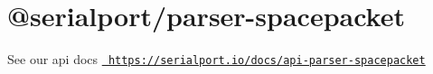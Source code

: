 \chapter{@serialport/parser-\/spacepacket}
\hypertarget{md_Dashboard_2node__modules_2_0dserialport_2parser-spacepacket_2README}{}\label{md_Dashboard_2node__modules_2_0dserialport_2parser-spacepacket_2README}
\label{md_Dashboard_2node__modules_2_0dserialport_2parser-spacepacket_2README_autotoc_md92}%
%
 See our api docs \href{https://serialport.io/docs/api-parser-spacepacket}{\texttt{ https\+://serialport.\+io/docs/api-\/parser-\/spacepacket}} 